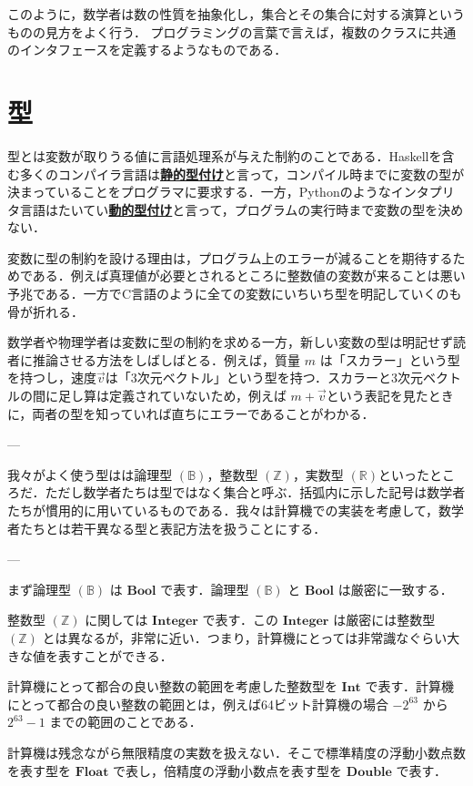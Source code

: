 \documentclass[a4paper,twocolumn]{jsbook}
\newcommand{\programminglanguage}[1]{\textsf{#1}}
\newcommand{\clang}{\programminglanguage{C}}
\newcommand{\haskell}{\programminglanguage{Haskell}}
\newcommand{\python}{\programminglanguage{Python}}
\newcommand{\keyword}[1]{{\underline{\textbf{#1}}}}
\newcommand{\mSpecialSet}[1]{\mathbb{#1}} %
\newcommand{\mBSet}{\mSpecialSet{B}}
\newcommand{\mRSet}{\mSpecialSet{R}}
\newcommand{\mZSet}{\mSpecialSet{Z}}
\newcommand{\mType}[1]{\mathbf{#1}}
\newcommand{\mBoolType}{\mType{Bool}}
\newcommand{\mFloatType}{\mType{Float}}
\newcommand{\mDoubleType}{\mType{Double}}
\newcommand{\mIntType}{\mType{Int}}
\newcommand{\mIntegerType}{\mType{Integer}}
\newcommand{\mVec}[1]{\Vec{#1}}
\begin{document}
このように，数学者は数の性質を抽象化し，集合とその集合に対する演算というものの見方をよく行う．
プログラミングの言葉で言えば，複数のクラスに共通のインタフェースを定義するようなものである．

\section{型}

型とは変数が取りうる値に言語処理系が与えた制約のことである．\haskell を含む多くのコンパイラ言語は\keyword{静的型付け}と言って，コンパイル時までに変数の型が決まっていることをプログラマに要求する．一方，\python のようなインタプリタ言語はたいてい\keyword{動的型付け}と言って，プログラムの実行時まで変数の型を決めない．

変数に型の制約を設ける理由は，プログラム上のエラーが減ることを期待するためである．例えば真理値が必要とされるところに整数値の変数が来ることは悪い予兆である．一方で\clang 言語のように全ての変数にいちいち型を明記していくのも骨が折れる．

数学者や物理学者は変数に型の制約を求める一方，新しい変数の型は明記せず読者に推論させる方法をしばしばとる．例えば，質量 $m$ は「スカラー」という型を持つし，速度$\mVec{v}$は「3次元ベクトル」という型を持つ．スカラーと3次元ベクトルの間に足し算は定義されていないため，例えば $m+\mVec{v}$という表記を見たときに，両者の型を知っていれば直ちにエラーであることがわかる．

---

我々がよく使う型はは論理型 $(\mBSet)$，整数型 $(\mZSet)$，実数型 $(\mRSet)$といったところだ．ただし数学者たちは型ではなく集合と呼ぶ．括弧内に示した記号は数学者たちが慣用的に用いているものである．我々は計算機での実装を考慮して，数学者たちとは若干異なる型と表記方法を扱うことにする．

---

まず論理型 $(\mBSet)$ は $\mBoolType$ で表す．論理型 $(\mBSet)$ と $\mBoolType$ は厳密に一致する．

整数型 $(\mZSet)$ に関しては $\mIntegerType$ で表す．この $\mIntegerType$ は厳密には整数型 $(\mZSet)$ とは異なるが，非常に近い．つまり，計算機にとっては非常識なぐらい大きな値を表すことができる．

計算機にとって都合の良い整数の範囲を考慮した整数型を $\mIntType$ で表す．計算機にとって都合の良い整数の範囲とは，例えば64ビット計算機の場合 $-2^{63}$ から $2^{63}-1$ までの範囲のことである．

計算機は残念ながら無限精度の実数を扱えない．そこで標準精度の浮動小数点数を表す型を $\mFloatType$ で表し，倍精度の浮動小数点を表す型を $\mDoubleType$ で表す．
\end{document}
